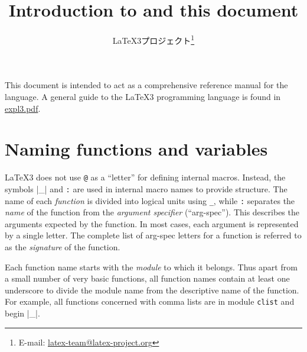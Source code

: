 \documentclass[dvipdfmx,full,kernel]{wtpl3doc}
\begin{document}
\title{Introduction to  and this document}

\author{%
 \LaTeX3プロジェクト\thanks
   {%
     E-mail:
       \href{mailto:latex-team@latex-project.org}
         {latex-team@latex-project.org}%
   }%
}

\maketitle

This document is intended to act as a comprehensive reference manual
for the  language. A general guide to the \LaTeX3
programming language is found in \href{expl3.pdf}{expl3.pdf}.

\section{Naming functions and variables}

\LaTeX3 does not use \texttt{@} as a \enquote{letter} for defining
internal macros.  Instead, the symbols |_| and \texttt{:}
are used in internal macro names to provide structure. The name of
each \emph{function} is divided into logical units using \texttt{_},
while \texttt{:} separates the \emph{name} of the function from the
\emph{argument specifier} (\enquote{arg-spec}). This describes the arguments
expected by the function. In most cases, each argument is represented
by a single letter. The complete list of arg-spec letters for a function
is referred to as the \emph{signature} of the function.

Each function name starts with the \emph{module} to which it belongs.
Thus apart from a small number of very basic functions, all 
function names contain at least one underscore to divide the module
name from the descriptive name of the function. For example, all
functions concerned with comma lists are in module \texttt{clist} and
begin |\clist_|.
\end{document}
